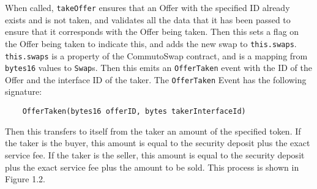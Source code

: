 \documentclass[11pt]{article}
\begin{document}
    When called, \verb|takeOffer| ensures that an Offer with the specified ID already exists and is
    not taken, and validates all the data that it has been passed to ensure that it corresponds with
    the Offer being taken.
    Then this sets a flag on the Offer being taken to indicate this, and adds the new swap to
    \verb|this.swaps|.
    \verb|this.swaps| is a property of the CommutoSwap contract, and is a mapping from
    \verb|bytes16| values to \verb|Swap|s.
    Then this emits an \verb|OfferTaken| event with the ID of the Offer and the interface ID of the
    taker.
    The \verb|OfferTaken| Event has the following signature:
    \begin{verbatim}
    OfferTaken(bytes16 offerID, bytes takerInterfaceId)
    \end{verbatim}
    Then this transfers to itself from the taker an amount of the specified token.
    If the taker is the buyer, this amount is equal to the security deposit plus the exact service
    fee.
    If the taker is the seller, this amount is equal to the security deposit plus the exact service
    fee plus the amount to be sold.
    This process is shown in Figure 1.2.
\end{document}
